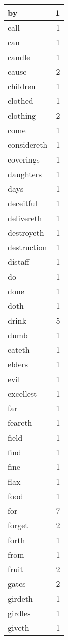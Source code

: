 \begin{center}
\begin{longtable}{l|r}
by & 1\\ \hline 
call & 1\\ \hline 
can & 1\\ \hline 
candle & 1\\ \hline 
cause & 2\\ \hline 
children & 1\\ \hline 
clothed & 1\\ \hline 
clothing & 2\\ \hline 
come & 1\\ \hline 
considereth & 1\\ \hline 
coverings & 1\\ \hline 
daughters & 1\\ \hline 
days & 1\\ \hline 
deceitful & 1\\ \hline 
delivereth & 1\\ \hline 
destroyeth & 1\\ \hline 
destruction & 1\\ \hline 
distaff & 1\\ \hline 
do & 1\\ \hline 
done & 1\\ \hline 
doth & 1\\ \hline 
drink & 5\\ \hline 
dumb & 1\\ \hline 
eateth & 1\\ \hline 
elders & 1\\ \hline 
evil & 1\\ \hline 
excellest & 1\\ \hline 
far & 1\\ \hline 
feareth & 1\\ \hline 
field & 1\\ \hline 
find & 1\\ \hline 
fine & 1\\ \hline 
flax & 1\\ \hline 
food & 1\\ \hline 
for & 7\\ \hline 
forget & 2\\ \hline 
forth & 1\\ \hline 
from & 1\\ \hline 
fruit & 2\\ \hline 
gates & 2\\ \hline 
girdeth & 1\\ \hline 
girdles & 1\\ \hline 
giveth & 1\\ \hline 

\end{longtable}
\end{center}
